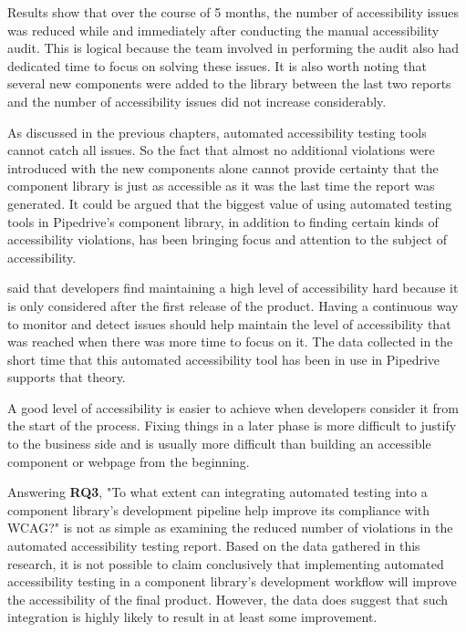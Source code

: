 \documentclass{master_thesis}
\begin{document}
Results show that over the course of 5 months, the number of accessibility issues was reduced while and immediately after conducting the manual accessibility audit. This is logical because the team involved in performing the audit also had dedicated time to focus on solving these issues. It is also worth noting that several new components were added to the library between the last two reports and the number of accessibility issues did not increase considerably.

As discussed in the previous chapters, automated accessibility testing tools cannot catch all issues. So the fact that almost no additional violations were introduced with the new components alone cannot provide certainty that the component library is just as accessible as it was the last time the report was generated. It could be argued that the biggest value of using automated testing tools in Pipedrive's component library, in addition to finding certain kinds of accessibility violations, has been bringing focus and attention to the subject of accessibility.

\citeauthor{Paterno2020} \citeyearpar{Paterno2020} said that developers find maintaining a high level of accessibility hard because it is only considered after the first release of the product. Having a continuous way to monitor and detect issues should help maintain the level of accessibility that was reached when there was more time to focus on it. The data collected in the short time that this automated accessibility tool has been in use in Pipedrive supports that theory.

A good level of accessibility is easier to achieve when developers consider it from the start of the process. Fixing things in a later phase is more difficult to justify to the business side and is usually more difficult than building an accessible component or webpage from the beginning.


Answering \textbf{RQ3}, "To what extent can integrating automated testing into a component library's development pipeline help improve its compliance with WCAG?" is not as simple as examining the reduced number of violations in the automated accessibility testing report. Based on the data gathered in this research, it is not possible to claim conclusively that implementing automated accessibility testing in a component library's development workflow will improve the accessibility of the final product. However, the data does suggest that such integration is highly likely to result in at least some improvement.
\end{document}
